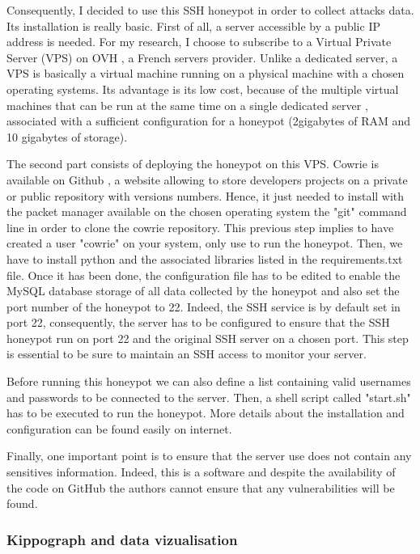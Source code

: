 Consequently, I decided to use this SSH honeypot in order to collect attacks data. Its 
installation is really basic. First of all, a server accessible by a public IP address is 
needed. For my research, I choose to subscribe to a Virtual Private Server (VPS) on OVH \cite{ovh}, a French
servers provider. Unlike a dedicated server, a VPS is basically a virtual machine running on a
physical machine with a chosen operating systems. Its advantage is its low cost, because of
the multiple virtual machines that can be run at the same time on a single dedicated server
, associated with a sufficient configuration for a honeypot (2gigabytes of RAM and 10 
gigabytes of storage).

The second part consists of deploying the honeypot on this VPS. Cowrie is available on Github \cite{github},
a website allowing to store developers projects on a private or public repository with versions
numbers. Hence, it just needed to install with the packet manager available on the chosen 
operating system the "git" command line in order to clone the cowrie repository. This previous
step implies to have created a user "cowrie" on your system, only use to run the honeypot.
Then, we have to install python and the associated libraries listed in the requirements.txt
file.
Once it has been done, the configuration file has to be edited to enable the MySQL \cite{mysql} database
storage of all data collected by the honeypot and also set the port number of the honeypot to
22. Indeed, the SSH service is by default set in port 22, consequently, the server has to be 
configured to ensure that the SSH honeypot run on port 22 and the original SSH server on a chosen
port. This step is essential to be sure to maintain an SSH access to monitor your server.

Before running this honeypot we can also define a list containing valid usernames and 
passwords to be connected to the server. Then, a shell script called "start.sh" has
to be executed to run the honeypot. More details about the installation and configuration
can be found easily on internet.

Finally, one important point is to ensure that the server use does not contain any sensitives
information. Indeed, this is a software and despite the availability of the code on
GitHub the authors cannot ensure that any vulnerabilities will be found.


\subsubsection{Kippograph and data vizualisation} %

